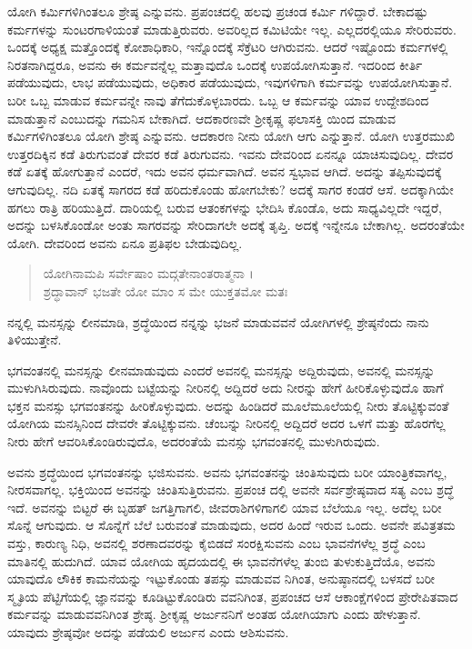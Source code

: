 ಯೋಗಿ ಕರ್ಮಿಗಳಿಗಿಂತಲೂ ಶ್ರೇಷ್ಠ ಎನ್ನುವನು. ಪ್ರಪಂಚದಲ್ಲಿ ಹಲವು ಪ್ರಚಂಡ ಕರ್ಮಿ ಗಳಿದ್ದಾರೆ. ಬೇಕಾದಷ್ಟು ಕರ್ಮಗಳನ್ನು ಸುಂಟರಗಾಳಿಯಂತೆ ಮಾಡುತ್ತಿರುವರು. ಅವರಿಲ್ಲದ ಕಮಿಟಿಯೇ ಇಲ್ಲ. ಎಲ್ಲದರಲ್ಲಿಯೂ ಸೇರಿರುವರು. ಒಂದಕ್ಕೆ ಅಧ್ಯಕ್ಷ ಮತ್ತೊಂದಕ್ಕೆ ಕೋಶಾಧಿಕಾರಿ, ಇನ್ನೊಂದಕ್ಕೆ ಸೆಕ್ರೆಟರಿ ಆಗಿರುವನು. ಆದರೆ ಇಷ್ಟೊಂದು ಕರ್ಮಗಳಲ್ಲಿ ನಿರತನಾಗಿದ್ದರೂ, ಅವನು ಈ ಕರ್ಮವನ್ನೆಲ್ಲ ಮತ್ತಾವುದೊ ಒಂದಕ್ಕೆ ಉಪಯೋಗಿಸುತ್ತಾನೆ. ಇದರಿಂದ ಕೀರ್ತಿ ಪಡೆಯುವುದು, ಲಾಭ ಪಡೆಯುವುದು, ಅಧಿಕಾರ ಪಡೆಯುವುದು, ಇವುಗಳಿಗಾಗಿ ಕರ್ಮವನ್ನು ಉಪಯೋಗಿಸುತ್ತಾನೆ. ಬರೀ ಒಬ್ಬ ಮಾಡುವ ಕರ್ಮವನ್ನೇ ನಾವು ತೆಗೆದುಕೊಳ್ಳಬಾರದು. ಒಬ್ಬ ಆ ಕರ್ಮವನ್ನು ಯಾವ ಉದ್ದೇಶದಿಂದ ಮಾಡುತ್ತಾನೆ ಎಂಬುದನ್ನು ಗಮನಿಸ ಬೇಕಾಗಿದೆ. ಆದಕಾರಣವೇ ಶ್ರೀಕೃಷ್ಣ ಫಲಾಸಕ್ತಿ ಯಿಂದ ಮಾಡುವ ಕರ್ಮಿಗಳಿಗಿಂತಲೂ ಯೋಗಿ ಶ್ರೇಷ್ಠ ಎನ್ನುವನು. ಆದಕಾರಣ ನೀನು ಯೋಗಿ ಆಗು ಎನ್ನುತ್ತಾನೆ. ಯೋಗಿ ಉತ್ತರಮುಖಿ ಉತ್ತರದಿಕ್ಕಿನ ಕಡೆ ತಿರುಗುವಂತೆ ದೇವರ ಕಡೆ ತಿರುಗುವನು. ಇವನು ದೇವರಿಂದ ಏನನ್ನೂ ಯಾಚಿಸುವುದಿಲ್ಲ. ದೇವರ ಕಡೆ ಏತಕ್ಕೆ ಹೋಗುತ್ತಾನೆ ಎಂದರೆ, ಇದು ಅವನ ಧರ್ಮವಾಗಿದೆ. ಅವನ ಸ್ವಭಾವ ಆಗಿದೆ. ಅದನ್ನು ತಪ್ಪಿಸುವುದಕ್ಕೆ ಆಗುವುದಿಲ್ಲ. ನದಿ ಏತಕ್ಕೆ ಸಾಗರದ ಕಡೆ ಹರಿದುಕೊಂಡು ಹೋಗಬೇಕು? ಅದಕ್ಕೆ ಸಾಗರ ಕಂಡರೆ ಆಸೆ. ಅದಕ್ಕಾಗಿಯೇ ಹಗಲು ರಾತ್ರಿ ಹರಿಯುತ್ತಿದೆ. ದಾರಿಯಲ್ಲಿ ಬರುವ ಆತಂಕಗಳನ್ನು ಭೇದಿಸಿ ಕೊಂಡೊ, ಅದು ಸಾಧ್ಯವಿಲ್ಲದೇ ಇದ್ದರೆ, ಅದನ್ನು ಬಳಸಿಕೊಂಡೋ ಅಂತು ಸಾಗರವನ್ನು ಸೇರಿದಾಗಲೇ ಅದಕ್ಕೆ ತೃಪ್ತಿ. ಅದಕ್ಕೆ ಇನ್ನೇನೂ ಬೇಕಾಗಿಲ್ಲ. ಅದರಂತೆಯೇ ಯೋಗಿ. ದೇವರಿಂದ ಅವನು ಏನೂ ಪ್ರತಿಫಲ ಬೇಡುವುದಿಲ್ಲ.

\begin{verse}
ಯೋಗಿನಾಮಪಿ ಸರ್ವೇಷಾಂ ಮದ್ಗತೇನಾಂತರಾತ್ಮನಾ ।\\ಶ್ರದ್ಧಾವಾನ್ ಭಜತೇ ಯೋ ಮಾಂ ಸ ಮೇ ಯುಕ್ತತಮೋ ಮತಃ 
\end{verse}

{\small ನನ್ನಲ್ಲಿ ಮನಸ್ಸನ್ನು ಲೀನಮಾಡಿ, ಶ್ರದ್ಧೆಯಿಂದ ನನ್ನನ್ನು ಭಜನೆ ಮಾಡುವವನೆ ಯೋಗಿಗಳಲ್ಲಿ ಶ್ರೇಷ್ಠನೆಂದು ನಾನು ತಿಳಿಯುತ್ತೇನೆ.}

ಭಗವಂತನಲ್ಲಿ ಮನಸ್ಸನ್ನು ಲೀನಮಾಡುವುದು ಎಂದರೆ ಅವನಲ್ಲಿ ಮನಸ್ಸನ್ನು ಅದ್ದಿರುವುದು, ಅವನಲ್ಲಿ ಮನಸ್ಸನ್ನು ಮುಳುಗಿಸಿರುವುದು. ನಾವೊಂದು ಬಟ್ಟೆಯನ್ನು ನೀರಿನಲ್ಲಿ ಅದ್ದಿದರೆ ಅದು ನೀರನ್ನು ಹೇಗೆ ಹೀರಿಕೊಳ್ಳುವುದೊ ಹಾಗೆ ಭಕ್ತನ ಮನಸ್ಸು ಭಗವಂತನನ್ನು ಹೀರಿಕೊಳ್ಳುವುದು. ಅದನ್ನು ಹಿಂಡಿದರೆ ಮೂಲೆಮೂಲೆಯಲ್ಲಿ ನೀರು ತೊಟ್ಟಿಕ್ಕುವಂತೆ ಯೋಗಿಯ ಮನಸ್ಸಿನಿಂದ ದೇವರೇ ತೊಟ್ಟಿಕ್ಕುವನು. ಚೆಂಬನ್ನು ನೀರಿನಲ್ಲಿ ಅದ್ದಿದರೆ ಅದರ ಒಳಗೆ ಮತ್ತು ಹೊರಗೆಲ್ಲ ನೀರು ಹೇಗೆ ಆವರಿಸಿಕೊಂಡಿರುವುದೊ, ಅದರಂತೆಯೆ ಮನಸ್ಸು ಭಗವಂತನಲ್ಲಿ ಮುಳುಗಿರುವುದು. 

ಅವನು ಶ್ರದ್ಧೆಯಿಂದ ಭಗವಂತನನ್ನು ಭಜಿಸುವನು. ಅವನು ಭಗವಂತನನ್ನು ಚಿಂತಿಸುವುದು ಬರೀ ಯಾಂತ್ರಿಕವಾಗಲ್ಲ, ನೀರಸವಾಗಲ್ಲ. ಭಕ್ತಿಯಿಂದ ಅವನನ್ನು ಚಿಂತಿಸುತ್ತಿರುವನು. ಪ್ರಪಂಚ ದಲ್ಲಿ ಅವನೇ ಸರ್ವಶ್ರೇಷ್ಠವಾದ ಸತ್ಯ ಎಂಬ ಶ್ರದ್ಧೆ ಇದೆ. ಅವನನ್ನು ಬಿಟ್ಟರೆ ಈ ಬೃಹತ್ ಜಗತ್ತಿಗಾಗಲಿ, ಜೀವರಾಶಿಗಳಿಗಾಗಲಿ ಯಾವ ಬೆಲೆಯೂ ಇಲ್ಲ. ಅದೆಲ್ಲ ಬರೀ ಸೊನ್ನೆ ಆಗುವುದು. ಆ ಸೊನ್ನೆಗೆ ಬೆಲೆ ಬರುವಂತೆ ಮಾಡುವುದು, ಅದರ ಹಿಂದೆ ಇರುವ ಒಂದು. ಅವನೇ ಪವಿತ್ರತಮ ವಸ್ತು, ಕಾರುಣ್ಯ ನಿಧಿ, ಅವನಲ್ಲಿ ಶರಣಾದವರನ್ನು ಕೈಬಿಡದೆ ಸಂರಕ್ಷಿಸುವನು ಎಂಬ ಭಾವನೆಗಳೆಲ್ಲ ಶ್ರದ್ಧೆ ಎಂಬ ಮಾತಿನಲ್ಲಿ ಹುದುಗಿದೆ. ಯಾವ ಯೋಗಿಯ ಹೃದಯದಲ್ಲಿ ಈ ಭಾವನೆಗಳೆಲ್ಲ ತುಂಬಿ ತುಳುಕುತ್ತಿದೆಯೊ, ಅವನು ಯಾವುದೊ ಲೌಕಿಕ ಕಾಮನೆಯನ್ನು ಇಟ್ಟುಕೊಂಡು ತಪಸ್ಸು ಮಾಡುವವ ನಿಗಿಂತ, ಅನುಷ್ಠಾನದಲ್ಲಿ ಬಳಸದೆ ಬರೀ ಸ್ಮೃತಿಯ ಪೆಟ್ಟಿಗೆಯಲ್ಲಿ ಜ್ಞಾನವನ್ನು ಕೂಡಿಟ್ಟುಕೊಂಡಿರು ವವನಿಗಿಂತ, ಪ್ರಪಂಚದ ಆಸೆ ಆಕಾಂಕ್ಷೆಗಳಿಂದ ಪ್ರೇರೇಪಿತವಾದ ಕರ್ಮವನ್ನು ಮಾಡುವವನಿಗಿಂತ ಶ್ರೇಷ್ಠ. ಶ್ರೀಕೃಷ್ಣ ಅರ್ಜುನನಿಗೆ ಅಂತಹ ಯೋಗಿಯಾಗು ಎಂದು ಹೇಳುತ್ತಾನೆ. ಯಾವುದು ಶ್ರೇಷ್ಠವೋ ಅದನ್ನು ಪಡೆಯಲಿ ಅರ್ಜುನ ಎಂದು ಆಶಿಸುವನು. 

